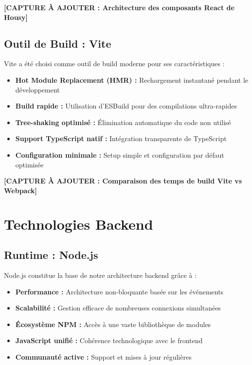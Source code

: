 \textbf{[CAPTURE À AJOUTER : Architecture des composants React de Housy]}

\subsection{Outil de Build : Vite}

Vite a été choisi comme outil de build moderne pour ses caractéristiques :

\begin{itemize}
    \item \textbf{Hot Module Replacement (HMR) :} Rechargement instantané pendant le développement
    \item \textbf{Build rapide :} Utilisation d'ESBuild pour des compilations ultra-rapides
    \item \textbf{Tree-shaking optimisé :} Élimination automatique du code non utilisé
    \item \textbf{Support TypeScript natif :} Intégration transparente de TypeScript
    \item \textbf{Configuration minimale :} Setup simple et configuration par défaut optimisée
\end{itemize}

\textbf{[CAPTURE À AJOUTER : Comparaison des temps de build Vite vs Webpack]}

\section{Technologies Backend}

\subsection{Runtime : Node.js}

Node.js constitue la base de notre architecture backend grâce à :

\begin{itemize}
    \item \textbf{Performance :} Architecture non-bloquante basée sur les événements
    \item \textbf{Scalabilité :} Gestion efficace de nombreuses connexions simultanées
    \item \textbf{Écosystème NPM :} Accès à une vaste bibliothèque de modules
    \item \textbf{JavaScript unifié :} Cohérence technologique avec le frontend
    \item \textbf{Communauté active :} Support et mises à jour régulières
\end{itemize}


